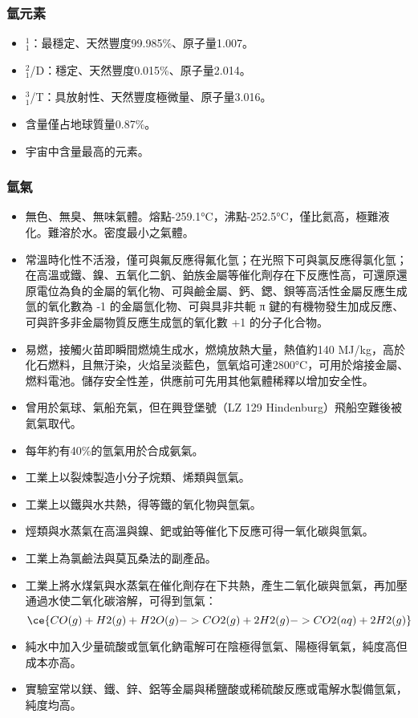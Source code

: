 \documentclass[a4paper,12pt]{report}
\begin{document}
\subsubsection{氫元素}
\begin{itemize}
\item {}$^1_1$\rmH：最穩定、天然豐度99.985\%、原子量1.007。
\item {}$^2_1$\rmH/D：穩定、天然豐度0.015\%、原子量2.014。
\item {}$^3_1$\rmH/T：具放射性、天然豐度極微量、原子量3.016。
\item 含量僅占地球質量0.87\%。
\item 宇宙中含量最高的元素。
\end{itemize}
\subsubsection{氫氣}
\begin{itemize}
\item 無色、無臭、無味氣體。熔點-259.1°C，沸點-252.5°C，僅比氦高，極難液化。難溶於水。密度最小之氣體。
\item 常溫時化性不活潑，僅可與氟反應得氟化氫；在光照下可與氯反應得氯化氫；在高溫或鐵、鎳、五氧化二釩、鉑族金屬等催化劑存在下反應性高，可還原還原電位為負的金屬的氧化物、可與鹼金屬、鈣、鍶、鋇等高活性金屬反應生成氫的氧化數為 -1 的金屬氫化物、可與具非共軛 π 鍵的有機物發生加成反應、可與許多非金屬物質反應生成氫的氧化數 +1 的分子化合物。
\item 易燃，接觸火苗即瞬間燃燒生成水，燃燒放熱大量，熱值約140 MJ/kg，高於化石燃料，且無汙染，火焰呈淡藍色，氫氧焰可達2800°C，可用於熔接金屬、燃料電池。儲存安全性差，供應前可先用其他氣體稀釋以增加安全性。
\item 曾用於氣球、氣船充氣，但在興登堡號（LZ 129 Hindenburg）飛船空難後被氦氣取代。
\item 每年約有40\%的氫氣用於合成氨氣。
\item 工業上以裂煉製造小分子烷類、烯類與氫氣。
\item 工業上以鐵與水共熱，得等鐵的氧化物與氫氣。
\item 烴類與水蒸氣在高溫與鎳、鈀或鉑等催化下反應可得一氧化碳與氫氣。
\item 工業上為氯鹼法與莫瓦桑法的副產品。
\item 工業上將水煤氣與水蒸氣在催化劑存在下共熱，產生二氧化碳與氫氣，再加壓通過水使二氧化碳溶解，可得到氫氣：
\[\ce{CO(g) + H2(g) + H2O(g) -> CO2(g) + 2H2(g) -> CO2(aq) + 2H2(g)}\]
\item 純水中加入少量硫酸或氫氧化鈉電解可在陰極得氫氣、陽極得氧氣，純度高但成本亦高。
\item 實驗室常以鎂、鐵、鋅、鋁等金屬與稀鹽酸或稀硫酸反應或電解水製備氫氣，純度均高。
\end{itemize}
\end{document}
